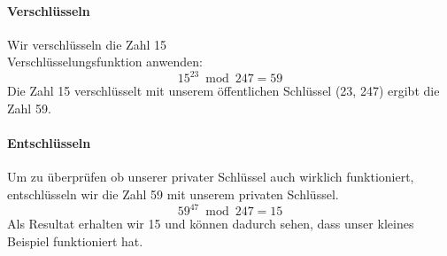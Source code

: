 \paragraph{Verschlüsseln}
Wir verschlüsseln die Zahl 15\\
Verschlüsselungsfunktion anwenden:
\begin{equation*}
  15^{23} \bmod 247 = 59
\end{equation*}
Die Zahl 15 verschlüsselt mit unserem öffentlichen Schlüssel (23, 247) ergibt die Zahl 59.
%
\paragraph{Entschlüsseln}
Um zu überprüfen ob unserer privater Schlüssel auch wirklich funktioniert, entschlüsseln wir die Zahl 59 mit unserem privaten Schlüssel.\\
\begin{equation*}
  59^{47} \bmod 247 = 15
\end{equation*}
Als Resultat erhalten wir 15 und können dadurch sehen, dass unser kleines Beispiel funktioniert hat.
%
%
